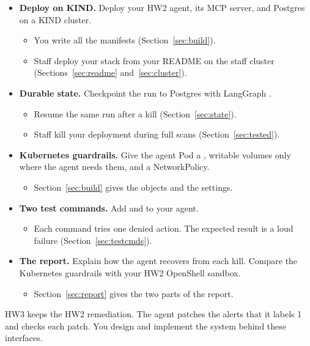 \documentclass[9pt,letterpaper]{article}
\begin{document}
\begin{itemize}
\item \textbf{Deploy on KIND.} Deploy your HW2 agent, its MCP server, and
  Postgres on a KIND cluster.
  \begin{itemize}
  \item You write all the manifests (Section~\ref{sec:build}).
  \item Staff deploy your stack from your README on the staff cluster
    (Sections~\ref{sec:readme} and~\ref{sec:cluster}).
  \end{itemize}

\item \textbf{Durable state.} Checkpoint the run to Postgres with LangGraph
  .
  \begin{itemize}
  \item Resume the same run after a kill (Section~\ref{sec:state}).
  \item Staff kill your deployment during full scans (Section~\ref{sec:tested}).
  \end{itemize}

\item \textbf{Kubernetes guardrails.} Give the agent Pod a
  , writable volumes only where the agent needs them, and
  a NetworkPolicy.
  \begin{itemize}
  \item Section~\ref{sec:build} gives the objects and the settings.
  \end{itemize}

\item \textbf{Two test commands.} Add  and
   to your agent.
  \begin{itemize}
  \item Each command tries one denied action. The expected result is a loud
    failure (Section~\ref{sec:testcmds}).
  \end{itemize}

\item \textbf{The report.} Explain how the agent recovers from each kill.
  Compare the Kubernetes guardrails with your HW2 OpenShell sandbox.
  \begin{itemize}
  \item Section~\ref{sec:report} gives the two parts of the report.
  \end{itemize}
\end{itemize}

HW3 keeps the HW2 remediation. The agent patches the alerts that it labels 1
and checks each patch. You design and implement the system behind these
interfaces.
\end{document}
